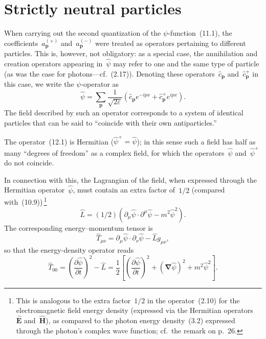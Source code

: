 \section{Strictly neutral particles}

When carrying out the second quantization of the $\psi$-function~(11.1), the coefficients~$a^{(+)}_\mathbf{p}$ and~$a^{(-)}_\mathbf{p}$ were treated as operators pertaining to different particles. This is, however, not obligatory: as a special case, the annihilation and creation operators appearing in~$\hat{\psi}$ may refer to one and the same type of particle (as was the case for photons---cf.~(2.17)). Denoting these operators~$\hat{c}_\mathbf{p}$ and~$\hat{c}^+_\mathbf{p}$ in this case, we write the $\psi$-operator as
\begin{equation}
\hat{\psi} = \sum_\mathbf{p} \frac{1}{\sqrt{2\varepsilon}} (\hat{c}_\mathbf{p} e^{-ipx} + \hat{c}^+_\mathbf{p} e^{ipx}).
\tag{12.1}
\end{equation}
The field described by such an operator corresponds to a system of identical particles that can be said to ``coincide with their own antiparticles.''

The operator~(12.1) is Hermitian ($\hat{\psi}^+ = \hat{\psi}$); in this sense such a field has half as many ``degrees of freedom'' as a complex field, for which the operators~$\hat{\psi}$ and~$\hat{\psi}^+$ do not coincide.

In connection with this, the Lagrangian of the field, when expressed through the Hermitian operator~$\hat{\psi}$, must contain an extra factor of~$1/2$ (compared with~(10.9))\,\footnote{This is analogous to the extra factor~$1/2$ in the operator~(2.10) for the electromagnetic field energy density (expressed via the Hermitian operators~$\hat{\mathbf{E}}$ and~$\hat{\mathbf{H}}$), as compared to the photon energy density~(3.2) expressed through the photon's complex wave function; cf.\ the remark on p.~26.}
\begin{equation}
\hat{L} = (1/2)(\partial_\mu\hat{\psi} \cdot \partial^\mu\hat{\psi} - m^2\hat{\psi}^2).
\tag{12.2}
\end{equation}
The corresponding energy--momentum tensor is
\begin{equation}
\hat{T}_{\mu\nu} = \partial_\mu\hat{\psi} \cdot \partial_\nu\hat{\psi} - \hat{L}g_{\mu\nu},
\tag{12.3}
\end{equation}
so that the energy-density operator reads
\begin{equation}
\hat{T}_{00} = \left(\frac{\partial\hat{\psi}}{\partial t}\right)^2 - \hat{L} = \frac{1}{2}\left[\left(\frac{\partial\hat{\psi}}{\partial t}\right)^2 + (\boldsymbol{\nabla}\hat{\psi})^2 + m^2\hat{\psi}^2\right].
\tag{12.4}
\end{equation}

